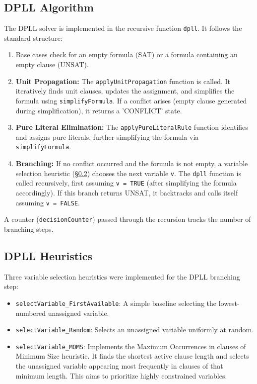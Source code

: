 \documentclass[12pt, a4paper]{article}
\begin{document}
\subsection{DPLL Algorithm}
The DPLL solver is implemented in the recursive function \texttt{dpll}. It follows the standard structure:
\begin{enumerate}
    \item Base cases check for an empty formula (SAT) or a formula containing an empty clause (UNSAT).
    \item \textbf{Unit Propagation:} The \texttt{applyUnitPropagation} function is called. It iteratively finds unit clauses, updates the assignment, and simplifies the formula using \texttt{simplifyFormula}. If a conflict arises (empty clause generated during simplification), it returns a 'CONFLICT' state.
    \item \textbf{Pure Literal Elimination:} The \texttt{applyPureLiteralRule} function identifies and assigns pure literals, further simplifying the formula via \texttt{simplifyFormula}.
    \item \textbf{Branching:} If no conflict occurred and the formula is not empty, a variable selection heuristic (\S\ref{subsec:dpll_heuristics_impl}) chooses the next variable \texttt{v}. The \texttt{dpll} function is called recursively, first assuming \texttt{v = TRUE} (after simplifying the formula accordingly). If this branch returns UNSAT, it backtracks and calls itself assuming \texttt{v = FALSE}.
\end{enumerate}
A counter (\texttt{decisionCounter}) passed through the recursion tracks the number of branching steps.

\subsection{DPLL Heuristics}
\label{subsec:dpll_heuristics_impl}
Three variable selection heuristics were implemented for the DPLL branching step:
\begin{itemize}
    \item \texttt{selectVariable\_FirstAvailable}: A simple baseline selecting the lowest-numbered unassigned variable.
    \item \texttt{selectVariable\_Random}: Selects an unassigned variable uniformly at random.
    \item \texttt{selectVariable\_MOMS}: Implements the Maximum Occurrences in clauses of Minimum Size heuristic. It finds the shortest active clause length and selects the unassigned variable appearing most frequently in clauses of that minimum length. This aims to prioritize highly constrained variables.
\end{itemize}
\end{document}
